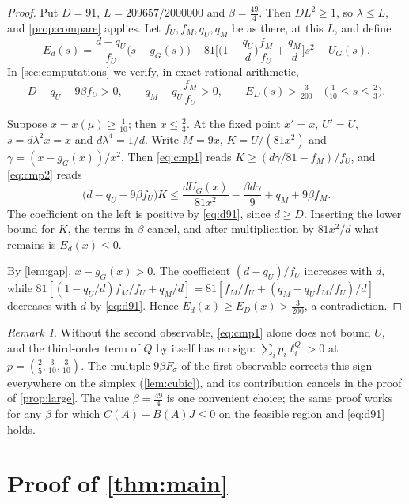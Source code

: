 \documentclass[11pt]{amsart}
\theoremstyle{definition}
\theoremstyle{remark}
\newtheorem{remark}[theorem]{Remark}
\begin{document}
\begin{proof}
Put $D=91$, $L=209657/2000000$ and $\beta=\tfrac{49}4$. Then $DL^2\ge1$, so $\lambda\le L$, and
\cref{prop:compare} applies. Let $f_U,f_M,q_U,q_M$ be as there, at this $L$, and define
\[
E_d(s)=\frac{d-q_U}{f_U}\big(s-g_G(s)\big)-81\Big[\Big(1-\frac{q_U}d\Big)\frac{f_M}{f_U}+\frac{q_M}d\Big]s^2-U_G(s).
\]
In \cref{sec:computations} we verify, in exact rational arithmetic,
\begin{equation}\label{eq:d91}
D-q_U-9\beta f_U>0,\qquad q_M-q_U\frac{f_M}{f_U}>0,\qquad E_D(s)>\tfrac3{200}\quad\big(\tfrac1{10}\le s\le\tfrac23\big).
\end{equation}

Suppose $x=x(\mu)\ge\tfrac1{10}$; then $x\le\tfrac23$. At the fixed point $x'=x$, $U'=U$, $s=d\lambda^2x=x$ and
$d\lambda^4=1/d$. Write $M=9x$, $K=U/(81x^2)$ and $\gamma=(x-g_G(x))/x^2$. Then \eqref{eq:cmp1} reads
$K\ge(d\gamma/81-f_M)/f_U$, and \eqref{eq:cmp2} reads
\[
\big(d-q_U-9\beta f_U\big)K\le\frac{dU_G(x)}{81x^2}-\frac{\beta d\gamma}9+q_M+9\beta f_M.
\]
The coefficient on the left is positive by \eqref{eq:d91}, since $d\ge D$. Inserting the lower bound for $K$, the
terms in $\beta$ cancel, and after multiplication by $81x^2/d$ what remains is $E_d(x)\le0$.

By \cref{lem:gap}, $x-g_G(x)>0$. The coefficient $(d-q_U)/f_U$ increases with $d$, while
$81[(1-q_U/d)f_M/f_U+q_M/d]=81[f_M/f_U+(q_M-q_Uf_M/f_U)/d]$ decreases with $d$ by \eqref{eq:d91}. Hence
$E_d(x)\ge E_D(x)>\tfrac3{200}$, a contradiction.
\end{proof}

\begin{remark}\label{rem:ug}
Without the second observable, \eqref{eq:cmp1} alone does not bound $U$, and the third-order term of $Q$ by itself
has no sign: $\sum_ip_i\ell_i^Q>0$ at $p=(\tfrac25,\tfrac3{10},\tfrac3{10})$. The multiple $9\beta F_\sigma$ of the
first observable corrects this sign everywhere on the simplex (\cref{lem:cubic}), and its contribution cancels in
the proof of \cref{prop:large}. The value $\beta=\tfrac{49}4$ is one convenient choice; the same proof works for
any $\beta$ for which $C(A)+B(A)J\le0$ on the feasible region and \eqref{eq:d91} holds.
\end{remark}

\section{Proof of \texorpdfstring{\cref{thm:main}}{Theorem 1.1}}\label{sec:proof}
\end{document}
